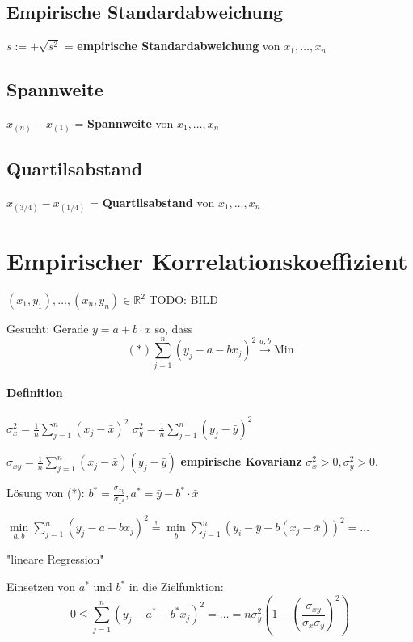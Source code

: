 \documentclass[a4paper,11pt,notitlepage]{report}
\newcommand{\R}{{\ensuremath{\mathbb{R}}}}
\begin{document}
\subsection{Empirische Standardabweichung}
$s := + \sqrt{s^2}$ = \textbf{empirische Standardabweichung} von $x_1,\ldots,x_n$

\subsection{Spannweite}
$x_{(n)} - x_{(1)}$ = \textbf{Spannweite} von $x_1,\ldots,x_n$

\subsection{Quartilsabstand}
$x_{(3/4)} - x_{(1/4)}$ = \textbf{Quartilsabstand} von $x_1,\ldots,x_n$

\section{Empirischer Korrelationskoeffizient}

$(x_1,y_1), \ldots, (x_n,y_n) \in \R^2$
TODO: BILD

Gesucht: Gerade $y = a + b \cdot x$ so, dass
$$(*) \sum\limits_{j=1}^{n}{(y_j - a - b x_j)^2} \overset{a,b}\rightarrow \text{Min}$$

\paragraph{Definition}
$\sigma_{x}^2 = \frac{1}{n}\sum\limits_{j=1}^{n}{(x_j - \bar{x})^2}$
$\sigma_{y}^2 = \frac{1}{n}\sum\limits_{j=1}^{n}{(y_j - \bar{y})^2}$

$\sigma_{xy} = \frac{1}{n}\sum\limits_{j=1}^{n}{(x_j - \bar{x})(y_j - \bar{y})}$ \textbf{empirische Kovarianz} $\sigma_x^2 > 0, \sigma_y^2 >0.$

Lösung von (*):
$b^* = \frac{\sigma_{xy}}{\sigma_{x^2}}, a^*= \bar{y} - b^* \cdot \bar{x}$


$\min\limits_{a,b} {\sum\limits_{j=1}^{n}{(y_j - a - b x_j)^2}} \stackrel{!}{=} \min\limits_{b}{\sum\limits_{j=1}^{n}{(y_i - \bar{y} - b (x_j - \bar{x}))^2}}=\ldots$

"lineare Regression"
\newline

Einsetzen von $a^*$ und $b^*$ in die Zielfunktion:
$$0 \leq \sum\limits_{j=1}^{n}{(y_j - a^* - b^* x_j)^2} = \ldots = n \sigma_y^2 (1-(\frac{\sigma_{xy}}{\sigma_x \sigma_y})^2)$$
\end{document}
